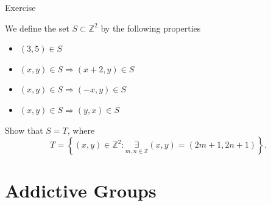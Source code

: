 \documentclass{beamer}
\begin{document}
\begin{frame}{Exercise}
    \par We define the set $S \subset \mathbb{Z}^2$ by the following properties
    \begin{itemize}
        \item $(3,5) \in S$
        \item $(x,y) \in S \Rightarrow (x + 2,y) \in S$
        \item $(x,y) \in S \Rightarrow (-x,y) \in S$
        \item $(x,y) \in S \Rightarrow (y,x) \in S$
    \end{itemize}
    \par Show that $S = T$, where
    $$
    T=\left\{(x, y) \in \mathbb{Z}^{2}: \underset{m, n \in \mathbb{Z}}\exists(x, y)=(2 m+1,2 n+1)\right\}.
    $$
\end{frame}
\section{Addictive Groups}
\end{document}
